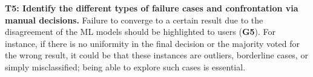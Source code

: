 \textbf{T5: Identify the different types of failure cases and confrontation via manual decisions.} Failure to converge to a certain result due to the disagreement of the ML models should be highlighted to users (\textbf{G5}). For instance, if there is no uniformity in the final decision or the majority voted for the wrong result, it could be that these instances are outliers, borderline cases, or simply misclassified; being able to explore such cases is essential.